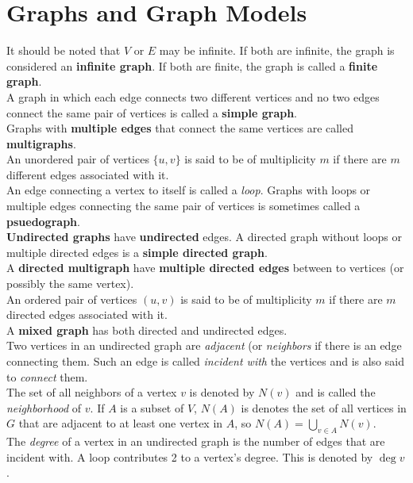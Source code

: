 \documentclass[./Discrete Math.tex]{subfiles}
\begin{document}
	\section{Graphs and Graph Models}
		It should be noted that \(V\) or \(E\) may be infinite. If both are infinite, the graph is considered an \textbf{infinite graph}. If both are finite, the graph is called a \textbf{finite graph}. \\
		A graph in which each edge connects two different vertices and no two edges connect the same pair of vertices is called a \textbf{simple graph}. \\
		Graphs with \textbf{multiple edges} that connect the same vertices are called \textbf{multigraphs}. \\
		An unordered pair of vertices \(\{u, v\}\) is said to be of multiplicity \(m\) if there are \(m\) different edges associated with it. \\
		An edge connecting a vertex to itself is called a \textit{loop}.
		Graphs with loops or multiple edges connecting the same pair of vertices is sometimes called a \textbf{psuedograph}. \\
		\textbf{Undirected graphs} have \textbf{undirected} edges.
		A directed graph without loops or multiple directed edges is a \textbf{simple directed graph}. \\
		A \textbf{directed multigraph} have \textbf{multiple directed edges} between to vertices (or possibly the same vertex). \\
		An ordered pair of vertices \((u, v)\) is said to be of multiplicity \(m\) if there are \(m\) directed edges associated with it. \\
		A \textbf{mixed graph} has both directed and undirected edges. \\
		Two vertices in an undirected graph are \textit{adjacent} (or \textit{neighbors} if there is an edge connecting them. Such an edge is called \textit{incident with} the vertices and is also said to \textit{connect} them. \\
		The set of all neighbors of a vertex \(v\) is denoted by \(N(v)\) and is called the \textit{neighborhood} of \(v\). If \(A\) is a subset of \(V\), \(N(A)\) is denotes the set of all vertices in \(G\) that are adjacent to at least one vertex in \(A\), so \(N(A) = \bigcup\limits_{v \in A} N(v)\). \\
		The \textit{degree} of a vertex in an undirected graph is the number of edges that are incident with. A loop contributes 2 to a vertex's degree. This is denoted by \(\deg v\).
	\setcounter{section}{2}
\end{document}
